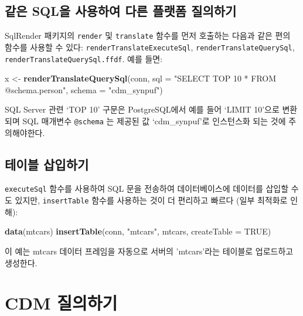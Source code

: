 \documentclass[11pt]{book}
\newenvironment{Shaded}{\begin{snugshade}}{\end{snugshade}}
\newcommand{\KeywordTok}[1]{\textcolor[rgb]{0.13,0.29,0.53}{\textbf{#1}}}
\newcommand{\DataTypeTok}[1]{\textcolor[rgb]{0.13,0.29,0.53}{#1}}
\newcommand{\StringTok}[1]{\textcolor[rgb]{0.31,0.60,0.02}{#1}}
\newcommand{\OtherTok}[1]{\textcolor[rgb]{0.56,0.35,0.01}{#1}}
\newcommand{\NormalTok}[1]{#1}
\theoremstyle{definition}
\theoremstyle{definition}
\theoremstyle{definition}
\theoremstyle{remark}
\begin{document}
\subsection{같은 SQL을 사용하여 다른 플랫폼 질의하기}\label{-sql----}

SqlRender 패키지의 \texttt{render} 및 \texttt{translate} 함수를 먼저
호출하는 다음과 같은 편의 함수를 사용할 수 있다:
\texttt{renderTranslateExecuteSql}, \texttt{renderTranslateQuerySql},
\texttt{renderTranslateQuerySql.ffdf}. 예를 들면:

\begin{Shaded}
\begin{Highlighting}[]
\NormalTok{x <-}\StringTok{ }\KeywordTok{renderTranslateQuerySql}\NormalTok{(conn, }
                             \DataTypeTok{sql =} \StringTok{"SELECT TOP 10 * FROM @schema.person"}\NormalTok{,}
                             \DataTypeTok{schema =} \StringTok{"cdm_synpuf"}\NormalTok{)}
\end{Highlighting}
\end{Shaded}

SQL Server 관련 `TOP 10' 구문은 PostgreSQL에서 예를 들어 `LIMIT 10'으로
변환되며 SQL 매개변수 \texttt{@schema} 는 제공된 값 `cdm\_synpuf'로
인스턴스화 되는 것에 주의해야한다.

\subsection{테이블 삽입하기}\label{-}

\texttt{executeSql} 함수를 사용하여 SQL 문을 전송하여 데이터베이스에
데이터를 삽입할 수도 있지만, \texttt{insertTable} 함수를 사용하는 것이
더 편리하고 빠르다 (일부 최적화로 인해):

\begin{Shaded}
\begin{Highlighting}[]
\KeywordTok{data}\NormalTok{(mtcars)}
\KeywordTok{insertTable}\NormalTok{(conn, }\StringTok{"mtcars"}\NormalTok{, mtcars, }\DataTypeTok{createTable =} \OtherTok{TRUE}\NormalTok{)}
\end{Highlighting}
\end{Shaded}

이 예는 mtcars 데이터 프레임을 자동으로 서버의 'mtcars'라는 테이블로
업로드하고 생성한다.

\section{CDM 질의하기}\label{QueryTheCdm}
\end{document}
